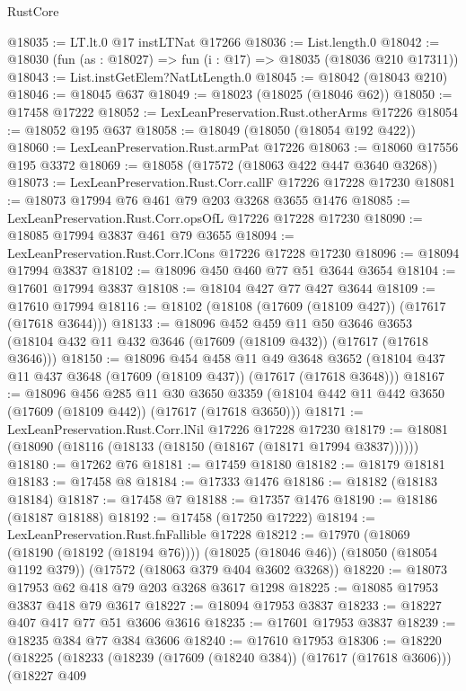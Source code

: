 \begin{lexlean}{RustCore}
\begin{coremodule}
@18035 := LT.lt.{0} @17 instLTNat @17266
@18036 := List.length.{0}
@18042 := @18030 (fun (as : @18027) => fun (i : @17) => @18035 (@18036 @210 @17311))
@18043 := List.instGetElem?NatLtLength.{0}
@18045 := @18042 (@18043 @210)
@18046 := @18045 @637
@18049 := @18023 (@18025 (@18046 @62))
@18050 := @17458 @17222
@18052 := LexLeanPreservation.Rust.otherArms @17226
@18054 := @18052 @195 @637
@18058 := @18049 (@18050 (@18054 @192 @422))
@18060 := LexLeanPreservation.Rust.armPat @17226
@18063 := @18060 @17556 @195 @3372
@18069 := @18058 (@17572 (@18063 @422 @447 @3640 @3268))
@18073 := LexLeanPreservation.Rust.Corr.callF @17226 @17228 @17230
@18081 := @18073 @17994 @76 @461 @79 @203 @3268 @3655 @1476
@18085 := LexLeanPreservation.Rust.Corr.opsOfL @17226 @17228 @17230
@18090 := @18085 @17994 @3837 @461 @79 @3655
@18094 := LexLeanPreservation.Rust.Corr.lCons @17226 @17228 @17230
@18096 := @18094 @17994 @3837
@18102 := @18096 @450 @460 @77 @51 @3644 @3654
@18104 := @17601 @17994 @3837
@18108 := @18104 @427 @77 @427 @3644
@18109 := @17610 @17994
@18116 := @18102 (@18108 (@17609 (@18109 @427)) (@17617 (@17618 @3644)))
@18133 := @18096
    @452
    @459
    @11
    @50
    @3646
    @3653
    (@18104 @432 @11 @432 @3646 (@17609 (@18109 @432)) (@17617 (@17618 @3646)))
@18150 := @18096
    @454
    @458
    @11
    @49
    @3648
    @3652
    (@18104 @437 @11 @437 @3648 (@17609 (@18109 @437)) (@17617 (@17618 @3648)))
@18167 := @18096
    @456
    @285
    @11
    @30
    @3650
    @3359
    (@18104 @442 @11 @442 @3650 (@17609 (@18109 @442)) (@17617 (@17618 @3650)))
@18171 := LexLeanPreservation.Rust.Corr.lNil @17226 @17228 @17230
@18179 := @18081 (@18090 (@18116 (@18133 (@18150 (@18167 (@18171 @17994 @3837))))))
@18180 := @17262 @76
@18181 := @17459 @18180
@18182 := @18179 @18181
@18183 := @17458 @8
@18184 := @17333 @1476
@18186 := @18182 (@18183 @18184)
@18187 := @17458 @7
@18188 := @17357 @1476
@18190 := @18186 (@18187 @18188)
@18192 := @17458 (@17250 @17222)
@18194 := LexLeanPreservation.Rust.fnFallible @17228
@18212 := @17970
    (@18069 (@18190 (@18192 (@18194 @76))))
    (@18025 (@18046 @46))
    (@18050 (@18054 @1192 @379))
    (@17572 (@18063 @379 @404 @3602 @3268))
@18220 := @18073 @17953 @62 @418 @79 @203 @3268 @3617 @1298
@18225 := @18085 @17953 @3837 @418 @79 @3617
@18227 := @18094 @17953 @3837
@18233 := @18227 @407 @417 @77 @51 @3606 @3616
@18235 := @17601 @17953 @3837
@18239 := @18235 @384 @77 @384 @3606
@18240 := @17610 @17953
@18306 := @18220
    (@18225
      (@18233
        (@18239 (@17609 (@18240 @384)) (@17617 (@17618 @3606)))
        (@18227
          @409

\end{coremodule}
\end{lexlean}
